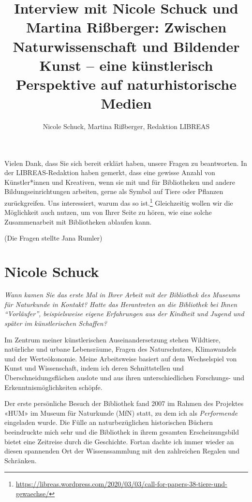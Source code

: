 \documentclass[a4paper,
fontsize=11pt,
oneside,
numbers=noperiodatend,
parskip=half-,
bibliography=totoc,
final
]{scrartcl}
\title{\LARGE{Interview mit Nicole Schuck und Martina Rißberger: Zwischen Naturwissenschaft und Bildender Kunst – eine künstlerisch Perspektive auf naturhistorische Medien}}%
\author{Nicole Schuck, Martina Rißberger, Redaktion LIBREAS} %
\date{}
\begin{document}
\maketitle
\thispagestyle{fancyplain} 


Vielen Dank, dass Sie sich bereit erklärt haben, unsere Fragen zu
beantworten. In der LIBREAS-Redaktion haben gemerkt, dass eine gewisse
Anzahl von Künstler*innen und Kreativen, wenn sie mit und für
Bibliotheken und andere Bildungseinrichtungen arbeiten, gerne als Symbol
auf Tiere oder Pflanzen zurückgreifen. Uns interessiert, warum das so
ist.\footnote{\url{https://libreas.wordpress.com/2020/03/03/call-for-papers-38-tiere-und-gewaechse/}}
Gleichzeitig wollen wir die Möglichkeit auch nutzen, um von Ihrer Seite
zu hören, wie eine solche Zusammenarbeit mit Bibliotheken ablaufen kann.

(Die Fragen stellte Jana Rumler)

\hypertarget{nicole-schuck}{%
\section{Nicole Schuck}\label{nicole-schuck}}

\emph{Wann kamen Sie das erste Mal in Ihrer Arbeit mit der Bibliothek
des Museums für Naturkunde in Kontakt? Hatte das Herantreten an die
Bibliothek bei Ihnen \enquote{Vorläufer}, beispielsweise eigene
Erfahrungen aus der Kindheit und Jugend und später im künstlerischen
Schaffen?}

Im Zentrum meiner künstlerischen Auseinandersetzung stehen Wildtiere,
natürliche und urbane Lebensräume, Fragen des Naturschutzes,
Klimawandels und der Werteökonomie. Meine Arbeitsweise basiert auf dem
Wechselspiel von Kunst und Wissenschaft, indem ich deren Schnittstellen
und Überschneidungsflächen auslote und aus ihren unterschiedlichen
Forschungs- und Erkenntnismöglichkeiten schöpfe.

Der erste persönliche Besuch der Bibliothek fand 2007 im Rahmen des
Projektes «HUM» im Museum für Naturkunde (MfN) statt, zu dem ich als
\emph{Performende} eingeladen wurde. Die Fülle an naturbezüglichen
historischen Büchern beeindruckte mich sehr und die Bibliothek in ihrem
gesamten Erscheinungsbild bietet eine Zeitreise durch die Geschichte.
Fortan dachte ich immer wieder an diesen spannenden Ort der
Wissenssammlung mit den zahlreichen Regalen und Schränken.
\end{document}
